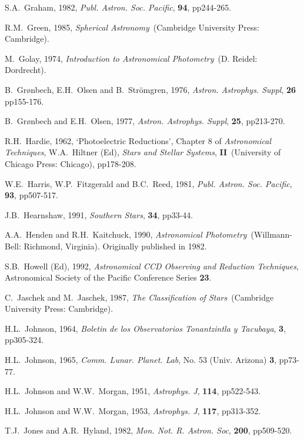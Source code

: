 \documentclass[twoside,11pt]{article}
\begin{document}
\begin{thebibliography}{99}
   S.A.~Graham, 1982, {\it Publ. Astron.
   Soc. Pacific}, {\bf 94}, pp244-265.

   R.M.~Green, 1985, {\it Spherical Astronomy}\,
   (Cambridge University Press: Cambridge).

   M.~Golay, 1974, {\it Introduction to Astronomical
   Photometry}\, (D. Reidel: Dordrecht).

   B.~Gr\o nbech, E.H.~Olsen and B.~Str\"{o}mgren,
   1976, {\it Astron. Astrophys. Suppl}, {\bf 26} pp155-176.

   B.~Gr\o nbech and E.H.~Olsen, 1977, {\it
   Astron. Astrophys. Suppl}, {\bf 25}, pp213-270.
  
   R.H.~Hardie, 1962, `Photoelectric Reductions',
   Chapter 8 of {\it Astronomical Techniques}, W.A.~Hiltner (Ed), {\it
   Stars and Stellar Systems}, {\bf II}\, (University of Chicago Press:
   Chicago), pp178-208.

   W.E.~Harris, W.P.~Fitzgerald and B.C.~Reed, 1981,
   {\it Publ. Astron. Soc. Pacific}, {\bf 93}, pp507-517.

   J.B.~Hearnshaw, 1991, {\it Southern Stars},
   {\bf 34}, pp33-44.

   A.A.~Henden and R.H.~Kaitchuck, 1990, {\it
   Astronomical Photometry}\, (Willmann-Bell: Richmond, Virginia).
   Originally published in 1982.

   S.B.~Howell (Ed), 1992, {\it Astronomical CCD
   Observing and Reduction Techniques}, Astronomical Society of the
   Pacific Conference Series {\bf 23}.

   C.~Jaschek and M.~Jaschek, 1987, {\it The
  Classification of Stars}\, (Cambridge University Press: Cambridge).

   H.L.~Johnson, 1964, {\it Boletin de los
   Observatorios Tonantzintla y Tacubaya}, {\bf 3}, pp305-324.

   H.L.~Johnson, 1965, {\it Comm. Lunar. Planet.
   Lab}, No. 53 (Univ. Arizona) {\bf 3}, pp73-77.

   H.L.~Johnson and W.W.~Morgan, 1951, {\it
   Astrophys. J}, {\bf 114}, pp522-543.

   H.L.~Johnson and W.W.~Morgan, 1953, {\it
   Astrophys. J}, {\bf 117}, pp313-352.

   T.J.~Jones and A.R.~Hyland, 1982, {\it Mon. Not. R.
   Astron. Soc}, {\bf 200}, pp509-520.


\end{thebibliography}
\end{document}
